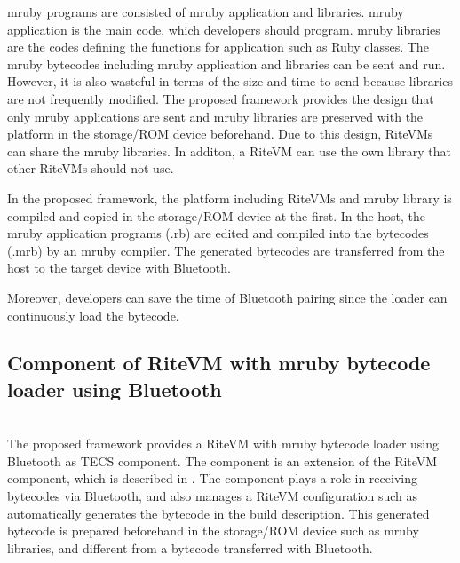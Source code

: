 \documentclass[a4j,12pt,oneside,openany,english]{jsbook}
\begin{document}
mruby programs are consisted of mruby application and libraries.
mruby application is the main code, which developers should program.
mruby libraries are the codes defining the functions for application such as Ruby classes. 
The mruby bytecodes including mruby application and libraries can be sent and run.
However, it is also wasteful in terms of the size and time to send because libraries are not frequently modified. 
The proposed framework provides the design that only mruby applications are sent and mruby libraries are preserved with the platform in the storage/ROM device beforehand.
Due to this design, RiteVMs can share the mruby libraries.
In additon, a RiteVM can use the own library that other RiteVMs should not use.

In the proposed framework, the platform including RiteVMs and mruby library is compiled and copied in the storage/ROM device at the first.
In the host, the mruby application programs (.rb) are edited and compiled into the bytecodes (.mrb) by an mruby compiler.
The generated bytecodes are transferred from the host to the target device with Bluetooth.

Moreover, developers can save the time of Bluetooth pairing since the loader can continuously load the bytecode.


\subsection{Component of RiteVM with mruby bytecode loader using Bluetooth} \mbox{}\\

The proposed framework provides a RiteVM with mruby bytecode loader using Bluetooth as TECS component.
The component is an extension of the RiteVM component, which is described in \cite{par:mrubyonTECS}.
The component plays a role in receiving bytecodes via Bluetooth, and also manages a RiteVM configuration such as automatically generates the bytecode in the build description.
This generated bytecode is prepared beforehand in the storage/ROM device such as mruby libraries, and different from a bytecode transferred with Bluetooth.
\end{document}
